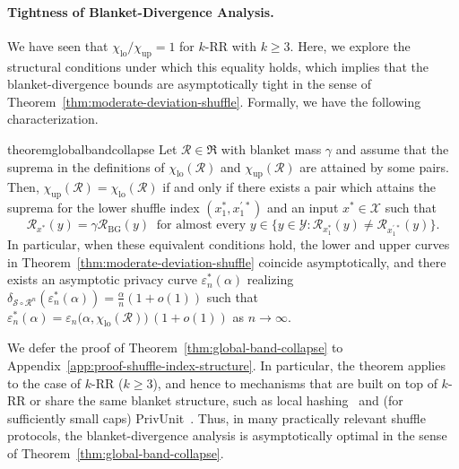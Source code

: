 \documentclass{article}
\theoremstyle{plain}
\theoremstyle{definition}
\begin{document}
\paragraph{Tightness of Blanket-Divergence Analysis.}
We have seen that $\chi_\mathrm{lo}/\chi_\mathrm{up}=1$ for $k$-RR with $k\ge 3$.
Here, we explore the structural conditions under which this equality holds, which implies that the blanket-divergence bounds are asymptotically tight in the sense of Theorem~\ref{thm:moderate-deviation-shuffle}. 
Formally, we have the following characterization.

\begin{restatable}{theorem}{globalbandcollapse}
\label{thm:global-band-collapse}
Let $\mathcal{R}\in\mathfrak{R}$ with blanket mass $\gamma$ and
assume that the suprema in the definitions of $\chi_{\mathrm{lo}}(\mathcal{R})$ and $\chi_{\mathrm{up}}(\mathcal{R})$ are attained by some pairs.
Then, $\chi_{\mathrm{up}}(\mathcal{R}) = \chi_{\mathrm{lo}}(\mathcal{R})$ if and only if there exists a pair which attains the suprema for the lower shuffle index $(x_1^\ast,x_1^{\prime\,\ast})$ and an input $x^\ast\in\mathcal X$ such that
  \[
    \mathcal{R}_{x^\ast}(y)
    = \gamma\mathcal{R}_{\mathrm{BG}}(y)
    \ \text{ for almost every }y\in\bigl\{ y\in\mathcal Y : \mathcal{R}_{x_1^\ast}(y)\neq \mathcal{R}_{x_1^{\prime\,\ast}}(y) \bigr\}.
  \]
In particular, when these equivalent conditions hold, the lower and upper curves in Theorem~\ref{thm:moderate-deviation-shuffle} coincide asymptotically, and
there exists an asymptotic privacy curve $\varepsilon_n^\ast(\alpha)$ realizing $\delta_{\mathcal{S}\circ\mathcal{R}^n}(\varepsilon_n^\ast(\alpha)) = \frac{\alpha}{n}(1+o(1))$ such that
$
  \varepsilon_n^\ast(\alpha)
  = \varepsilon_n\bigl(\alpha,\chi_{\mathrm{lo}}(\mathcal{R})\bigr)\,(1+o(1))
$ as $n\to\infty.$
\end{restatable}
We defer the proof of Theorem~\ref{thm:global-band-collapse} to
Appendix~\ref{app:proof-shuffle-index-structure}. 
In particular, the theorem applies to the case of $k$-RR ($k\geq 3$), and hence to mechanisms that are built on top of $k$-RR or share the same blanket structure, such as local hashing~\cite{wangLocallyDifferentiallyPrivate2017} and (for sufficiently small caps) PrivUnit~\cite{asiOptimalAlgorithmsMean2022}. 
Thus, in many practically relevant shuffle protocols, the blanket-divergence
analysis is asymptotically optimal in the sense of Theorem~\ref{thm:global-band-collapse}.
\end{document}
